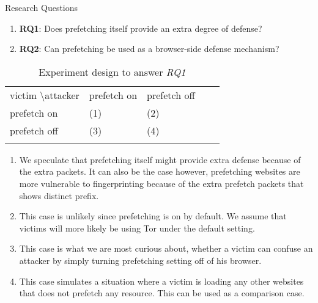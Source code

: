 Research Questions
\begin{enumerate}
\item
{\bf RQ1}: Does prefetching itself provide an extra degree of defense?
\item
{\bf RQ2}: Can prefetching be used as a browser-side defense mechanism?
\end{enumerate}

\begin{table}[]
\centering
\caption{Experiment design to answer {\it RQ1}}
\label{table:prefetch}
\begin{tabular}{lllll}
\cline{1-3}
\multicolumn{1}{|l|}{victim \textbackslash attacker} & \multicolumn{1}{l|}{prefetch on} & \multicolumn{1}{l|}{prefetch off} &  &  \\ \cline{1-3}
\multicolumn{1}{|l|}{prefetch on}                    & \multicolumn{1}{l|}{(1)}         & \multicolumn{1}{l|}{(2)}          &  &  \\ \cline{1-3}
\multicolumn{1}{|l|}{prefetch off}                   & \multicolumn{1}{l|}{(3)}         & \multicolumn{1}{l|}{(4)}          &  &  \\ \cline{1-3}
                                                     &                                  &                                   &  & 
\end{tabular}                  
\end{table}

\begin{enumerate}
\item
We speculate that prefetching itself might provide extra defense because of the extra packets.
It can also be the case however, prefetching websites are more vulnerable to fingerprinting because of the extra prefetch packets that shows distinct prefix.
\item
This case is unlikely since prefetching is on by default. We assume that victims will more likely be using Tor under the default setting.
\item
This case is what we are most curious about, whether a victim can confuse an attacker by simply turning prefetching setting off of his browser.
\item
This case simulates a situation where a victim is loading any other websites that does not prefetch any resource.
This can be used as a comparison case.
\end{enumerate}

